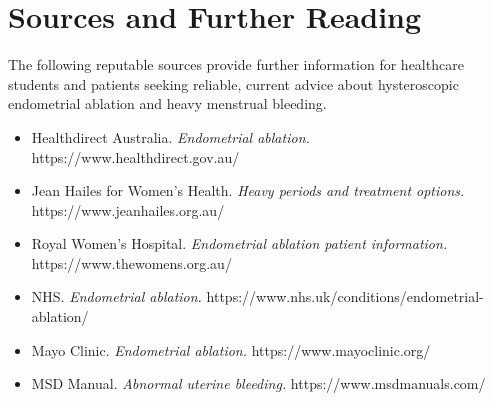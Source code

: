 \section*{Sources and Further Reading}
The following reputable sources provide further information for healthcare students and patients seeking reliable, current advice about hysteroscopic endometrial ablation and heavy menstrual bleeding.
\begin{itemize}
    \item Healthdirect Australia. \textit{Endometrial ablation.} https://www.healthdirect.gov.au/
    \item Jean Hailes for Women's Health. \textit{Heavy periods and treatment options.} https://www.jeanhailes.org.au/
    \item Royal Women's Hospital. \textit{Endometrial ablation patient information.} https://www.thewomens.org.au/
    \item NHS. \textit{Endometrial ablation.} https://www.nhs.uk/conditions/endometrial-ablation/
    \item Mayo Clinic. \textit{Endometrial ablation.} https://www.mayoclinic.org/
    \item MSD Manual. \textit{Abnormal uterine bleeding.} https://www.msdmanuals.com/
\end{itemize}
